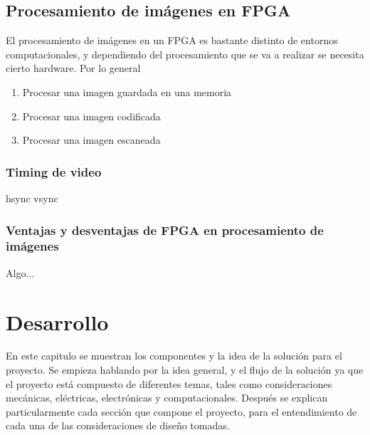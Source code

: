 \documentclass[twoside,spanish,ESP,MSc]{plantillaLabUPV}
\theoremstyle{definition}
\begin{document}
\section{Procesamiento de imágenes en FPGA}

El procesamiento de imágenes en un FPGA es bastante distinto de entornos computacionales, y dependiendo del procesamiento que se va a realizar se necesita cierto hardware. Por lo general 

\begin{enumerate}
 \item Procesar una imagen guardada en una memoria
 \item Procesar una imagen codificada
 \item Procesar una imagen escaneada
\end{enumerate}




\subsection{Timing de video}
hsync vsync

\subsection{Ventajas y desventajas de FPGA en procesamiento de imágenes}
Algo...






\chapter{Desarrollo}

En este capitulo se muestran los componentes y la idea de la solución para el proyecto. Se empieza hablando por la idea general, y el flujo de la solución ya que el proyecto está compuesto de diferentes temas, tales como consideraciones mecánicas, eléctricas, electrónicas y computacionales. Después se explican particularmente cada sección que compone el proyecto, para el entendimiento de cada una de las consideraciones de diseño tomadas.
\end{document}
